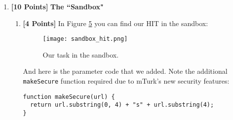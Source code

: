 \documentclass[11pt]{article}
\newcommand{\points}[1]{\textbf{[#1 Points]}}
\begin{document}
\begin{enumerate}
\begin{enumerate}
\begin{figure}[!h]
\centering
\texttt{[image: downloaded.png]}
\caption{TurkIt Framework is a go.}
\label{fig:downloaded_TurkIT}
\end{figure}

\begin{figure}[!h]
\centering
\texttt{[image: docs.png]}
\caption{Reviewing the docs for \texttt{mturk} object}
\label{fig:review_docs}
\end{figure}

% 
\item \points{1} See Figure \ref{fig:review_docs} for browsing  \url{http://groups.csail.mit.edu/uid/turkit/jsdocs/symbols/MTurk.html}
%
\item \points{2} 
See Figure \ref{fig:load_money} for loading \$7.

See Figure \ref{fig:mode_real} for changing the parameters in TurkIt to include our new AWS Key as well as setting it to run in ``real'' mode. 

Below, you will be able to find the solution to the wamr-up problem which allows us to view our balance. The balance on our account on first run was $\$7.00$:
\begin{lstlisting}
print("Hello MTurk!")
print("Your balance is: " + mturk.getAccountBalance()  )
print("No. of hits: "+ mturk.getHITs().length )

// Explore the HIT object. 
// Get the first HIT and then iterate over its properties.
if(mturk.getHITs().length > 0) {
  var hitObj = mturk.getHIT(0, true) 
  for(attr in hitObj) 
    print("Attr ="+attr+ " val="+hitObj[attr])
}
\end{lstlisting}
\begin{figure}[!h]
\centering
\texttt{[image: visa.png]}
\caption{Purchasing Prepaid HITs}
\label{fig:load_money}
\end{figure}


\begin{figure}[!h]
\centering
\texttt{[image: real.png]}
\caption{Changing maxMoney and mode of TurkIt.}
\label{fig:mode_real}
\end{figure}
\end{enumerate}


\item \points{10} {\bf The ``Sandbox"}
\begin{enumerate}
\item \points{4}
In Figure \ref{fig:sandbox_hit} you can find our HIT in the sandbox:
%
\begin{figure}[h]
\begin{center}
\texttt{[image: sandbox\_hit.png]}
\end{center}
\caption{Our task in the sandbox.}
\label{fig:sandbox_hit}
\end{figure}
%
And here is the parameter code that we added. Note the additional \texttt{makeSecure} function required due to mTurk's new security features:
\begin{lstlisting}
function makeSecure(url) {
  return url.substring(0, 4) + "s" + url.substring(4);
}


\end{lstlisting}
\end{enumerate}
\end{enumerate}
\end{document}
